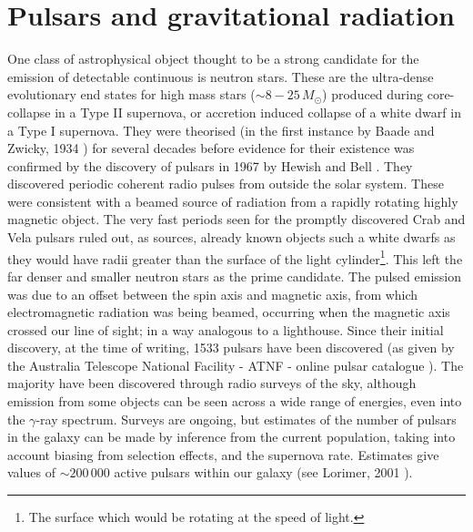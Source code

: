 \section{Pulsars and gravitational radiation}
One class of astrophysical object thought to be a strong candidate for the emission of detectable
continuous \gws is neutron stars. These are the ultra-dense evolutionary end states for high mass
stars ($\sim 8-25\,M_\odot$) produced during core-collapse in a Type II supernova, or accretion
induced collapse of a white dwarf in a Type I supernova. They were theorised (in the first instance
by Baade and Zwicky, 1934 \cite{Baade:1934}) for several decades before evidence for their existence
was confirmed by the discovery of pulsars in 1967 by Hewish and Bell \cite{HewishBell:1968}. They
discovered periodic coherent radio pulses from outside the solar system. These were consistent with
a beamed source of radiation from a rapidly rotating highly magnetic object. The very fast periods
seen for the promptly discovered Crab and Vela pulsars ruled out, as sources, already known objects
such a white dwarfs as they would have radii greater than the surface of the light
cylinder\footnote{The surface which would be rotating at the speed of light.}. This left the far
denser and smaller neutron stars as the prime candidate. The pulsed emission was due to an offset
between the spin axis and magnetic axis, from which electromagnetic radiation was being beamed,
occurring when the magnetic axis crossed our line of sight; in a way analogous to a lighthouse.
Since their initial discovery, at the time of writing, 1533 pulsars have been discovered (as given
by the Australia Telescope National Facility - ATNF - online pulsar catalogue \cite{ATNF}). The
majority have been discovered through radio surveys of the sky, although emission from some objects
can be seen across a wide range of energies, even into the $\gamma$-ray spectrum. Surveys are
ongoing, but estimates of the number of pulsars in the galaxy can be made by inference from the
current population, taking into account biasing from selection effects, and the supernova rate.
Estimates give values of $\sim 200\,000$ active pulsars within our galaxy (see Lorimer, 2001
\cite{Lorimer:2001}).

